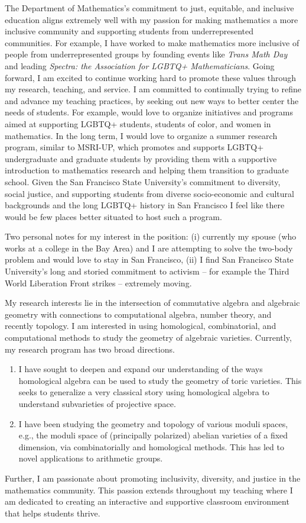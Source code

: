 \documentclass[11pt]{article}
\begin{document}
The Department of Mathematics's commitment to just, equitable, and inclusive education aligns extremely well with my passion for making mathematics a more inclusive community and supporting students from underrepresented communities. For example, I have worked to make mathematics more inclusive of people from underrepresented groups by founding events like \textit{Trans Math Day} and leading \textit{Spectra: the Association for LGBTQ+ Mathematicians}. Going forward, I am excited to continue working hard to promote these values through my research, teaching, and service. I am committed to continually trying to refine and advance my teaching practices, by seeking out new ways to better center the needs of students. For example, would love to organize initiatives and programs aimed at supporting LGBTQ+ students, students of color, and women in mathematics. In the long term, I would love to organize a summer research program, similar to MSRI-UP, which promotes and supports LGBTQ+ undergraduate and graduate students by providing them with a supportive introduction to mathematics research and helping them transition to graduate school. Given the San Francisco State University's commitment to diversity, social justice, and supporting students from diverse socio-economic and cultural backgrounds and the long LGBTQ+ history in San Francisco I feel like there would be few places better situated to host such a program. 

Two personal notes for my interest in the position: (i) currently my spouse (who works at a college in the Bay Area) and I are attempting to solve the two-body problem and would love to stay in San Francisco, (ii) I find San Francisco State University's long and storied commitment to activism -- for example the Third World Liberation Front strikes -- extremely moving. 

My research interests lie in the intersection of commutative algebra and algebraic geometry with connections to computational algebra, number theory, and recently topology. I am interested in using homological, combinatorial, and computational methods to study the geometry of algebraic varieties. Currently, my research program has two broad directions.
\begin{enumerate}[leftmargin=*,label=(\roman*)]
\item I have sought to deepen and expand our understanding of the ways homological algebra can be used to study the geometry of toric varieties. This seeks to generalize a very classical story using homological algebra to understand subvarieties of projective space.
\item I have been studying the geometry and topology of various moduli spaces, e.g., the moduli space of (principally polarized) abelian varieties of a fixed dimension, via combinatorially and homological methods. This has led to novel applications to arithmetic groups. 
\end{enumerate}
Further, I am passionate about promoting inclusivity, diversity, and justice in the mathematics community. This passion extends throughout my teaching where I am dedicated to creating an interactive and supportive classroom environment that helps students thrive. 
\end{document}

